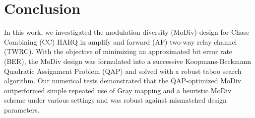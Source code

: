 \documentclass[journal]{IEEEtran}
\begin{document}
\section{Conclusion}
\label{sec:conclusion}
In this work, we investigated the modulation diversity (MoDiv) design for
Chase Combining (CC) HARQ in amplify and forward (AF) two-way relay channel
(TWRC). With the objective of minimizing an approximated
bit error rate (BER), the MoDiv design was formulated into a successive
Koopmans-Beckmann Quadratic Assignment Problem (QAP) and solved with a robust
taboo search algorithm. Our numerical tests demonstrated that the QAP-optimized
MoDiv outperformed simple repeated use of Gray mapping and a heuristic MoDiv
scheme under various settings and was robust against mismatched design parameters.
%
%



%
%
\end{document}
